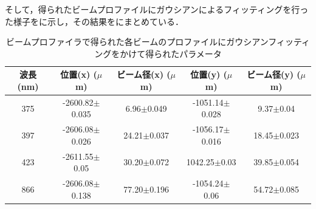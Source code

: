 そして，得られたビームプロファイルにガウシアンによるフィッティングを行った様子をに示し，その結果をにまとめている．\\

\begin{table}[h]
	\begin{center}
		\caption{ビームプロファイラで得られた各ビームのプロファイルにガウシアンフィッティングをかけて得られたパラメータ}
		\label{tab:GaussianFitting}
		\begin{tabular}{c|cc|cc} \hline \hline
			波長 (nm)&位置(x) ($\mu$m)&ビーム径(x) ($\mu$m) &位置(y) ($\mu$m)& ビーム径(y) ($\mu$m)\\ \hline
			375&-2600.82$\pm$0.035&6.96$\pm$0.049&-1051.14$\pm$0.028&9.37$\pm$0.04 \\
			397&-2606.08$\pm$0.026&24.21$\pm$0.037&-1056.17$\pm$0.016&18.45$\pm$0.023 \\
			423&-2611.55$\pm$0.05&30.20$\pm$0.072&1042.25$\pm$0.03&39.85$\pm$0.054 \\
			866&-2606.08$\pm$0.138&77.20$\pm$0.196&-1054.24$\pm$0.06&54.72$\pm$0.085 \\\hline
		\end{tabular}
	\end{center}
\end{table}

\clearpage

